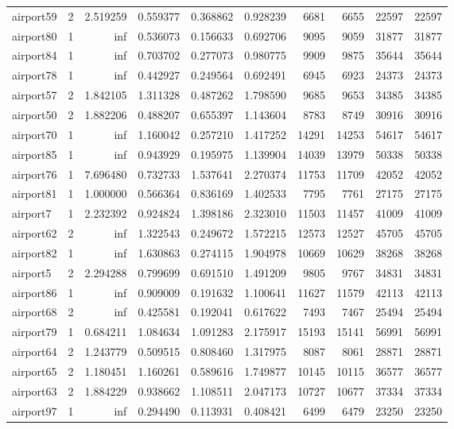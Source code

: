 \begin{longtable}{|l|r|r|r|r|r|r|r|r|r|}
airport59 & 2 & 2.519259 & 0.559377 & 0.368862 & 0.928239 & 6681 & 6655 & 22597 & 22597 \\
airport80 & 1 & inf & 0.536073 & 0.156633 & 0.692706 & 9095 & 9059 & 31877 & 31877 \\
airport84 & 1 & inf & 0.703702 & 0.277073 & 0.980775 & 9909 & 9875 & 35644 & 35644 \\
airport78 & 1 & inf & 0.442927 & 0.249564 & 0.692491 & 6945 & 6923 & 24373 & 24373 \\
airport57 & 2 & 1.842105 & 1.311328 & 0.487262 & 1.798590 & 9685 & 9653 & 34385 & 34385 \\
airport50 & 2 & 1.882206 & 0.488207 & 0.655397 & 1.143604 & 8783 & 8749 & 30916 & 30916 \\
airport70 & 1 & inf & 1.160042 & 0.257210 & 1.417252 & 14291 & 14253 & 54617 & 54617 \\
airport85 & 1 & inf & 0.943929 & 0.195975 & 1.139904 & 14039 & 13979 & 50338 & 50338 \\
airport76 & 1 & 7.696480 & 0.732733 & 1.537641 & 2.270374 & 11753 & 11709 & 42052 & 42052 \\
airport81 & 1 & 1.000000 & 0.566364 & 0.836169 & 1.402533 & 7795 & 7761 & 27175 & 27175 \\
airport7 & 1 & 2.232392 & 0.924824 & 1.398186 & 2.323010 & 11503 & 11457 & 41009 & 41009 \\
airport62 & 2 & inf & 1.322543 & 0.249672 & 1.572215 & 12573 & 12527 & 45705 & 45705 \\
airport82 & 1 & inf & 1.630863 & 0.274115 & 1.904978 & 10669 & 10629 & 38268 & 38268 \\
airport5 & 2 & 2.294288 & 0.799699 & 0.691510 & 1.491209 & 9805 & 9767 & 34831 & 34831 \\
airport86 & 1 & inf & 0.909009 & 0.191632 & 1.100641 & 11627 & 11579 & 42113 & 42113 \\
airport68 & 2 & inf & 0.425581 & 0.192041 & 0.617622 & 7493 & 7467 & 25494 & 25494 \\
airport79 & 1 & 0.684211 & 1.084634 & 1.091283 & 2.175917 & 15193 & 15141 & 56991 & 56991 \\
airport64 & 2 & 1.243779 & 0.509515 & 0.808460 & 1.317975 & 8087 & 8061 & 28871 & 28871 \\
airport65 & 2 & 1.180451 & 1.160261 & 0.589616 & 1.749877 & 10145 & 10115 & 36577 & 36577 \\
airport63 & 2 & 1.884229 & 0.938662 & 1.108511 & 2.047173 & 10727 & 10677 & 37334 & 37334 \\
airport97 & 1 & inf & 0.294490 & 0.113931 & 0.408421 & 6499 & 6479 & 23250 & 23250 \\

\end{longtable}
